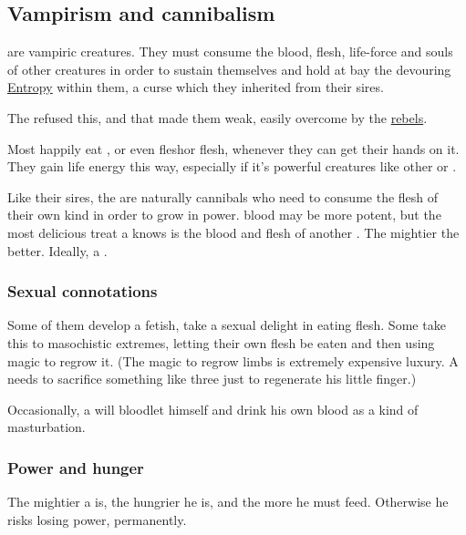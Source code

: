 \subsection{Vampirism and cannibalism}
\label{Resphan vampirism}
\Resphain{} are vampiric creatures. They must consume the blood, flesh, life-force and souls of other creatures in order to sustain themselves and hold at bay the devouring \hyperref[Bane Entropy]{Entropy} within them, a curse which they inherited from their \bane{} sires.

The \hyperref[Good Resphan Empire]{\Merkyrans{}} refused this, and that made them weak, easily overcome by the \hyperref[Resphan rebellion]{rebels}. 

\label{Resphan cannibalism}
\label{Resphan diet}
Most \Resphain{} happily eat \human, \scatha{} or even \resphan{} flesh\dash or \dragon{} flesh, whenever they can get their hands on it. They gain life energy this way, especially if it's powerful creatures like other \resphain{} or \dragons. 

Like their \bane{} sires, the \resphain{} are naturally cannibals who need to consume the flesh of their own kind in order to grow in power. \Draconian{} blood may be more potent, but the most delicious treat a \resphan{} knows is the blood and flesh of another \resphan{}. The mightier the better. Ideally, a \hs\sathariah.




\subsubsection{Sexual connotations}
Some of them develop a  fetish, take a sexual delight in eating flesh. Some take this to masochistic extremes, letting their own flesh be eaten and then using magic to regrow it. (The magic to regrow limbs is extremely expensive luxury. A \resphan{} needs to sacrifice something like three \humans{} just to regenerate his little finger.) 

Occasionally, a \resphan{} will bloodlet himself and drink his own blood as a kind of masturbation.





\subsubsection{Power and hunger}
\label{Resphan power and hunger}
The mightier a \resphan{} is, the hungrier he is, and the more he must feed. Otherwise he risks losing power, permanently. 

